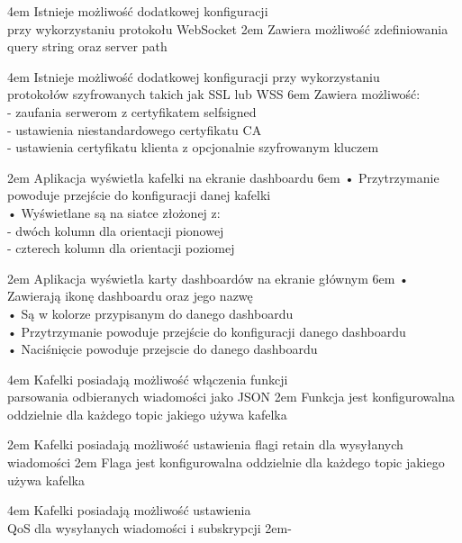{4em}{
    Istnieje możliwość dodatkowej konfiguracji\\
    przy wykorzystaniu protokołu WebSocket
}
{2em}{
    Zawiera możliwość zdefiniowania query string oraz server path
}

{4em}{
    Istnieje możliwość dodatkowej konfiguracji przy wykorzystaniu\\
    protokołów szyfrowanych takich jak SSL lub WSS
}
{6em}{
    Zawiera możliwość:\\
    - zaufania serwerom z certyfikatem selfsigned\\
    - ustawienia niestandardowego certyfikatu CA\\
    - ustawienia certyfikatu klienta z opcjonalnie szyfrowanym kluczem
}

{2em}{
    Aplikacja wyświetla kafelki na ekranie dashboardu
}
{6em}{
    • Przytrzymanie powoduje przejście do konfiguracji danej kafelki\\
    • Wyświetlane są na siatce złożonej z:\\
    - dwóch kolumn dla orientacji pionowej\\
    - czterech kolumn dla orientacji poziomej
}

{2em}{
    Aplikacja wyświetla karty dashboardów na ekranie głównym
}
{6em}{
    • Zawierają ikonę dashboardu oraz jego nazwę\\
    • Są w kolorze przypisanym do danego dashboardu\\
    • Przytrzymanie powoduje przejście do konfiguracji danego dashboardu\\
    • Naciśnięcie powoduje przejscie do danego dashboardu
}

{4em}{
    Kafelki posiadają możliwość włączenia funkcji\\
    parsowania odbieranych wiadomości jako JSON
}
{2em}{
    Funkcja jest konfigurowalna oddzielnie dla każdego topic jakiego używa kafelka
}

{2em}{
    Kafelki posiadają możliwość ustawienia flagi retain dla wysyłanych wiadomości
}
{2em}{
    Flaga jest konfigurowalna oddzielnie dla każdego topic jakiego używa kafelka
}

{4em}{
    Kafelki posiadają możliwość ustawienia\\
    QoS dla wysyłanych wiadomości i subskrypcji
}
{2em}{-}


